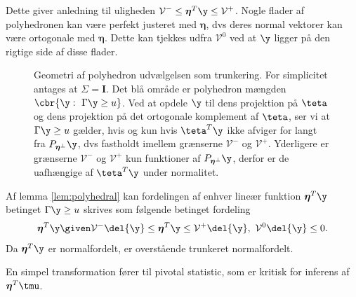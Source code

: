 Dette giver anledning til uligheden \(\mathcal{V}^- \leq \boldsymbol{\eta}^T \y \leq \mathcal{V}^+\).
Nogle flader af polyhedronen kan være perfekt justeret med \(\boldsymbol{\eta}\), dvs deres normal vektorer kan være ortogonale med \(\boldsymbol{\eta}\).
Dette kan tjekkes udfra \(\mathcal{V}^0\) ved at \(\y\) ligger på den rigtige side af disse flader.  

%
\begin{figure}[H]
\centering
\scalebox{1}{}
\caption{Geometri af polyhedron udvælgelsen som trunkering. For simplicitet antages at \(\Sigma = \mathbf{I}\). Det blå område er polyhedron mængden \(\cbr{\y : \ \Gamma \y \geq u}\).
Ved at opdele \(\y\) til dens projektion på \(\teta\) og dens projektion på det ortogonale komplement af \(\teta\), ser vi at \(\Gamma \y \geq u\) gælder, hvis og kun hvis \(\teta^T \y\) ikke afviger for langt fra \(P_{\boldsymbol{\eta}^\perp} \y\), dvs fastholdt imellem grænserne \(\mathcal{V}^-\) og \(\mathcal{V}^+\).
Yderligere er grænserne \(\mathcal{V}^-\) og \(\mathcal{V}^+\) kun funktioner af \(P_{\boldsymbol{\eta}^\perp} \y\), derfor er de uafhængige af \(\teta^T \y\) under normalitet.} \label{fig:polyhedron}
\end{figure}
%

Af lemma \ref{lem:polyhedral} kan fordelingen af enhver lineær funktion \(\boldsymbol{\eta}^T \y\) betinget \(\Gamma \y \geq u\) skrives som følgende betinget fordeling
\begin{align*}
\boldsymbol{\eta}^T \y \given \mathcal{V}^- \del{\y} \leq \boldsymbol{\eta}^T \y \leq \mathcal{V}^+ \del{\y}, \ \mathcal{V}^0 \del{\y} \leq 0.
\end{align*}
Da \(\boldsymbol{\eta}^T \y\) er normalfordelt, er overstående trunkeret normalfordelt.

En simpel transformation fører til pivotal statistic, som er kritisk for inferens af \(\boldsymbol{\eta}^T \tmu\).

